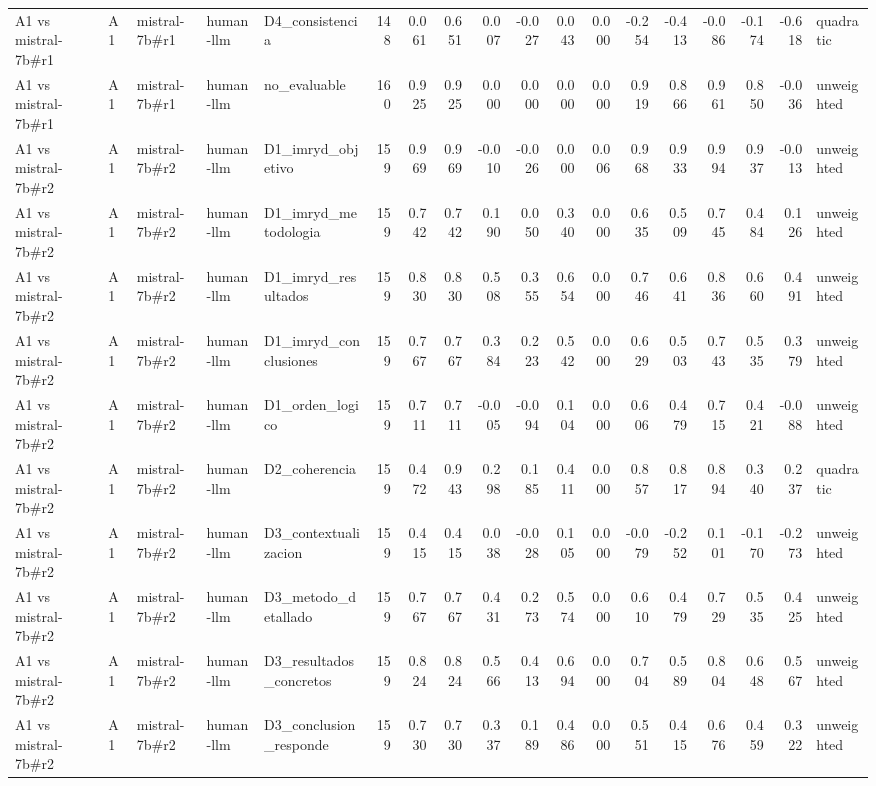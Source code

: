 \begin{table}
{\begin{tabular}{lllllrrrrrrrrrrrrl}
A1 vs mistral-7b\#r1 & A1 & mistral-7b\#r1 & human-llm & D4\_consistencia & 148 & 0.061 & 0.651 & 0.007 & -0.027 & 0.043 & 0.000 & -0.254 & -0.413 & -0.086 & -0.174 & -0.618 & quadratic \\
A1 vs mistral-7b\#r1 & A1 & mistral-7b\#r1 & human-llm & no\_evaluable & 160 & 0.925 & 0.925 & 0.000 & 0.000 & 0.000 & 0.000 & 0.919 & 0.866 & 0.961 & 0.850 & -0.036 & unweighted \\
A1 vs mistral-7b\#r2 & A1 & mistral-7b\#r2 & human-llm & D1\_imryd\_objetivo & 159 & 0.969 & 0.969 & -0.010 & -0.026 & 0.000 & 0.006 & 0.968 & 0.933 & 0.994 & 0.937 & -0.013 & unweighted \\
A1 vs mistral-7b\#r2 & A1 & mistral-7b\#r2 & human-llm & D1\_imryd\_metodologia & 159 & 0.742 & 0.742 & 0.190 & 0.050 & 0.340 & 0.000 & 0.635 & 0.509 & 0.745 & 0.484 & 0.126 & unweighted \\
A1 vs mistral-7b\#r2 & A1 & mistral-7b\#r2 & human-llm & D1\_imryd\_resultados & 159 & 0.830 & 0.830 & 0.508 & 0.355 & 0.654 & 0.000 & 0.746 & 0.641 & 0.836 & 0.660 & 0.491 & unweighted \\
A1 vs mistral-7b\#r2 & A1 & mistral-7b\#r2 & human-llm & D1\_imryd\_conclusiones & 159 & 0.767 & 0.767 & 0.384 & 0.223 & 0.542 & 0.000 & 0.629 & 0.503 & 0.743 & 0.535 & 0.379 & unweighted \\
A1 vs mistral-7b\#r2 & A1 & mistral-7b\#r2 & human-llm & D1\_orden\_logico & 159 & 0.711 & 0.711 & -0.005 & -0.094 & 0.104 & 0.000 & 0.606 & 0.479 & 0.715 & 0.421 & -0.088 & unweighted \\
A1 vs mistral-7b\#r2 & A1 & mistral-7b\#r2 & human-llm & D2\_coherencia & 159 & 0.472 & 0.943 & 0.298 & 0.185 & 0.411 & 0.000 & 0.857 & 0.817 & 0.894 & 0.340 & 0.237 & quadratic \\
A1 vs mistral-7b\#r2 & A1 & mistral-7b\#r2 & human-llm & D3\_contextualizacion & 159 & 0.415 & 0.415 & 0.038 & -0.028 & 0.105 & 0.000 & -0.079 & -0.252 & 0.101 & -0.170 & -0.273 & unweighted \\
A1 vs mistral-7b\#r2 & A1 & mistral-7b\#r2 & human-llm & D3\_metodo\_detallado & 159 & 0.767 & 0.767 & 0.431 & 0.273 & 0.574 & 0.000 & 0.610 & 0.479 & 0.729 & 0.535 & 0.425 & unweighted \\
A1 vs mistral-7b\#r2 & A1 & mistral-7b\#r2 & human-llm & D3\_resultados\_concretos & 159 & 0.824 & 0.824 & 0.566 & 0.413 & 0.694 & 0.000 & 0.704 & 0.589 & 0.804 & 0.648 & 0.567 & unweighted \\
A1 vs mistral-7b\#r2 & A1 & mistral-7b\#r2 & human-llm & D3\_conclusion\_responde & 159 & 0.730 & 0.730 & 0.337 & 0.189 & 0.486 & 0.000 & 0.551 & 0.415 & 0.676 & 0.459 & 0.322 & unweighted \\

\end{tabular}}
\end{table}

